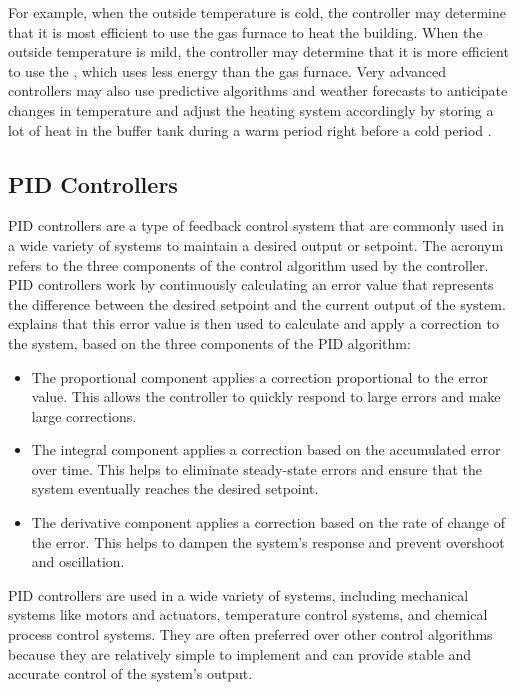 For example, when the outside temperature is cold, the controller may determine that it is most efficient to use the gas furnace to heat the building. When the outside temperature is mild, the controller may determine that it is more efficient to use the \HP, which uses less energy than the gas furnace. Very advanced controllers may also use predictive algorithms and weather forecasts to anticipate changes in temperature and adjust the heating system accordingly by storing a lot of heat in the buffer tank during a warm period right before a cold period \cite{demirezen_feasibility_2021}.

\subsection{PID Controllers}
\ac{PID} controllers are a type of feedback control system that are commonly used in a wide variety of systems to maintain a desired output or setpoint. The acronym refers to the three components of the control algorithm used by the controller. \ac{PID} controllers work by continuously calculating an error value that represents the difference between the desired setpoint and the current output of the system. \citeauthor{Rames_2012} \cite{Rames_2012} explains that this error value is then used to calculate and apply a correction to the system, based on the three components of the \ac{PID} algorithm:
\begin{itemize}
    \item The proportional component applies a correction proportional to the error value. This allows the controller to quickly respond to large errors and make large corrections.
    \item The integral component applies a correction based on the accumulated error over time. This helps to eliminate steady-state errors and ensure that the system eventually reaches the desired setpoint.
    \item The derivative component applies a correction based on the rate of change of the error. This helps to dampen the system's response and prevent overshoot and oscillation.  
\end{itemize}


\ac{PID} controllers are used in a wide variety of systems, including mechanical systems like motors and actuators, temperature control systems, and chemical process control systems. They are often preferred over other control algorithms because they are relatively simple to implement and can provide stable and accurate control of the system's output.

